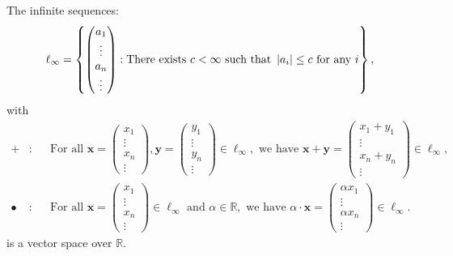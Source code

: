 \documentclass{huhtakm-template-book-v2}
\begin{document}
    \begin{eg}
        The infinite sequences:
        \begin{equation*}
            \ell_{\infty} = \left\{\begin{pmatrix}
                a_{1}\\\vdots\\a_{n}\\\vdots
            \end{pmatrix} : \text{There exists } c < \infty \text{ such that } \left|{a_{i}}\right| \leq c \text{ for any } i\right\},
        \end{equation*}
        with
        \begin{align*}
            +&: & &\text{For all } \mathbf{x} = \begin{pmatrix}x_{1}\\\vdots\\x_{n}\\\vdots\end{pmatrix}, \mathbf{y} = \begin{pmatrix}y_{1}\\\vdots\\y_{n}\\\vdots\end{pmatrix} \in \ell_{\infty}, \text{ we have } \mathbf{x} + \mathbf{y} = \begin{pmatrix}x_{1} + y_{1}\\\vdots\\x_{n} + y_{n}\\\vdots\end{pmatrix} \in \ell_{\infty},\\
            \bullet&: & &\text{For all } \mathbf{x} = \begin{pmatrix}x_{1}\\\vdots\\x_{n}\\\vdots\end{pmatrix} \in \ell_{\infty} \text{ and } \alpha \in \mathbb{R}, \text{ we have } \alpha \cdot \mathbf{x} = \begin{pmatrix}\alpha x_{1}\\\vdots\\\alpha x_{n}\\\vdots\end{pmatrix} \in \ell_{\infty}.
        \end{align*}
        is a vector space over $\mathbb{R}$.
    \end{eg}
    \newpage
    
\end{document}
